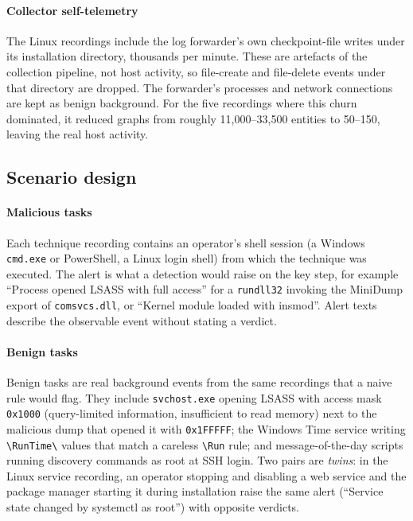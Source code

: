 \paragraph{Collector self-telemetry} The Linux recordings include the log forwarder's own checkpoint-file
writes under its installation directory, thousands per minute. These are artefacts of the collection pipeline,
not host activity, so file-create and file-delete events under that directory are dropped. The forwarder's
processes and network connections are kept as benign background. For the five recordings where this churn
dominated, it reduced graphs from roughly 11{,}000--33{,}500 entities to 50--150, leaving the real host
activity.

\ifconf\else

\fi

\subsection{Scenario design}
\paragraph{Malicious tasks} Each technique recording contains an operator's shell session (a Windows
\texttt{cmd.exe} or PowerShell, a Linux login shell) from which the technique was executed. The alert is what
a detection would raise on the key step, for example ``Process opened LSASS with full access'' for a
\texttt{rundll32} invoking the MiniDump export of \texttt{comsvcs.dll}, or ``Kernel module loaded with insmod''.
Alert texts describe the observable event without stating a verdict.

\paragraph{Benign tasks} Benign tasks are real background events from the same recordings that a naive
rule would flag. They include \texttt{svchost.exe} opening LSASS with access mask \texttt{0x1000}
(query-limited information, insufficient to read memory) next to the malicious dump that opened it with
\texttt{0x1FFFFF}; the Windows Time service writing \texttt{\textbackslash RunTime\textbackslash} values that
match a careless \texttt{\textbackslash Run} rule; and message-of-the-day scripts running discovery commands
as root at SSH login. Two pairs are \emph{twins}: in the Linux service recording, an operator stopping and
disabling a web service and the package manager starting it during installation raise the same alert
(``Service state changed by systemctl as root'') with opposite verdicts.


